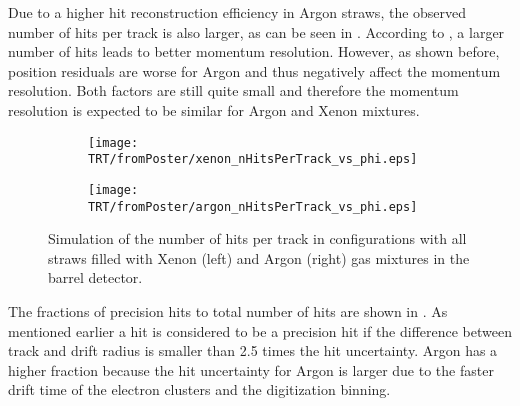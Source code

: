 
Due to a higher hit reconstruction efficiency in Argon straws, the observed number of hits per track is also larger, as can be seen in . 
According to , a larger number of hits leads to better momentum resolution. However, as shown before, position residuals are
worse for Argon and thus negatively affect the momentum resolution. Both factors are still quite small and therefore the momentum resolution is expected to be similar for
Argon and Xenon mixtures.

\begin{figure}[h]

\begin{subfigure}{.5\textwidth}
  \centering
  \texttt{[image: TRT/fromPoster/xenon\_nHitsPerTrack\_vs\_phi.eps]}
\end{subfigure}%
\begin{subfigure}{.5\textwidth}
  \centering
  \texttt{[image: TRT/fromPoster/argon\_nHitsPerTrack\_vs\_phi.eps]}
\end{subfigure}

\caption{Simulation of the number of hits per track in configurations with all straws filled with Xenon (left) and Argon (right) gas mixtures in the barrel detector.}
  \label{fig:nHitsPerTrack}
\end{figure}

The fractions of precision hits to total number of hits are shown in . As mentioned earlier a hit is considered to be a precision
hit if the difference between track and drift radius is smaller than 2.5 times the hit uncertainty. Argon has a higher fraction because the hit uncertainty
for Argon is larger due to the faster drift time of the electron clusters and the digitization binning. 


